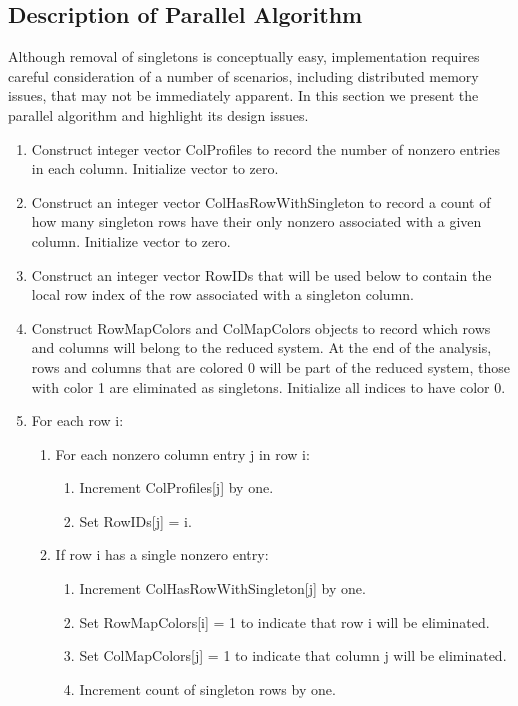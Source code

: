 \subsection{Description of Parallel Algorithm}

Although removal of singletons is conceptually easy, implementation requires careful
consideration of a number of scenarios, including distributed memory issues,
that may not be immediately apparent.  In this section we present the parallel algorithm
and highlight its design issues.

\begin{enumerate}
\item Construct integer vector ColProfiles to record the number of nonzero entries in each
column. Initialize vector to zero.
\item Construct an integer vector ColHasRowWithSingleton to record a count of how many
singleton rows have their only nonzero associated with a given column. Initialize vector
to zero.
\item Construct an integer vector RowIDs that will be used below to 
contain the local row index of the row associated with a singleton column.
\item Construct RowMapColors and ColMapColors objects to record which rows and columns
will belong to the reduced system.  At the end of the analysis, rows and columns that
are colored 0 will be part of the reduced system, those with color 1 are eliminated as
singletons. Initialize all indices to have color 0.
\item For each row i:
\begin{enumerate}
\item For each nonzero column entry j in row i:
\begin{enumerate}
\item Increment ColProfiles[j] by one.
\item Set RowIDs[j] = i.
\end{enumerate}
\item If row i has a single nonzero entry:
\begin{enumerate}
\item Increment ColHasRowWithSingleton[j] by one.
\item Set RowMapColors[i] = 1 to indicate that row i will be eliminated.
\item Set ColMapColors[j] = 1 to indicate that column j will be eliminated.
\item Increment count of singleton rows by one.
\end{enumerate}

\end{enumerate}
\end{enumerate}

